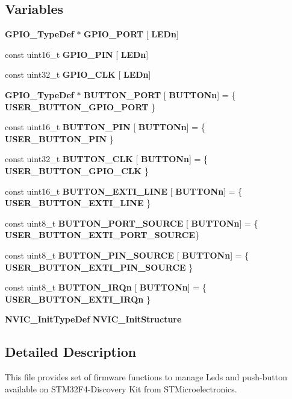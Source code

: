 \subsection*{Variables}
\begin{DoxyCompactItemize}
\item 
\textbf{ G\+P\+I\+O\+\_\+\+Type\+Def} $\ast$ \textbf{ G\+P\+I\+O\+\_\+\+P\+O\+RT} [\textbf{ L\+E\+Dn}]
\item 
const uint16\+\_\+t \textbf{ G\+P\+I\+O\+\_\+\+P\+IN} [\textbf{ L\+E\+Dn}]
\item 
const uint32\+\_\+t \textbf{ G\+P\+I\+O\+\_\+\+C\+LK} [\textbf{ L\+E\+Dn}]
\item 
\textbf{ G\+P\+I\+O\+\_\+\+Type\+Def} $\ast$ \textbf{ B\+U\+T\+T\+O\+N\+\_\+\+P\+O\+RT} [\textbf{ B\+U\+T\+T\+O\+Nn}] = \{\textbf{ U\+S\+E\+R\+\_\+\+B\+U\+T\+T\+O\+N\+\_\+\+G\+P\+I\+O\+\_\+\+P\+O\+RT} \}
\item 
const uint16\+\_\+t \textbf{ B\+U\+T\+T\+O\+N\+\_\+\+P\+IN} [\textbf{ B\+U\+T\+T\+O\+Nn}] = \{\textbf{ U\+S\+E\+R\+\_\+\+B\+U\+T\+T\+O\+N\+\_\+\+P\+IN} \}
\item 
const uint32\+\_\+t \textbf{ B\+U\+T\+T\+O\+N\+\_\+\+C\+LK} [\textbf{ B\+U\+T\+T\+O\+Nn}] = \{\textbf{ U\+S\+E\+R\+\_\+\+B\+U\+T\+T\+O\+N\+\_\+\+G\+P\+I\+O\+\_\+\+C\+LK} \}
\item 
const uint16\+\_\+t \textbf{ B\+U\+T\+T\+O\+N\+\_\+\+E\+X\+T\+I\+\_\+\+L\+I\+NE} [\textbf{ B\+U\+T\+T\+O\+Nn}] = \{\textbf{ U\+S\+E\+R\+\_\+\+B\+U\+T\+T\+O\+N\+\_\+\+E\+X\+T\+I\+\_\+\+L\+I\+NE} \}
\item 
const uint8\+\_\+t \textbf{ B\+U\+T\+T\+O\+N\+\_\+\+P\+O\+R\+T\+\_\+\+S\+O\+U\+R\+CE} [\textbf{ B\+U\+T\+T\+O\+Nn}] = \{\textbf{ U\+S\+E\+R\+\_\+\+B\+U\+T\+T\+O\+N\+\_\+\+E\+X\+T\+I\+\_\+\+P\+O\+R\+T\+\_\+\+S\+O\+U\+R\+CE}\}
\item 
const uint8\+\_\+t \textbf{ B\+U\+T\+T\+O\+N\+\_\+\+P\+I\+N\+\_\+\+S\+O\+U\+R\+CE} [\textbf{ B\+U\+T\+T\+O\+Nn}] = \{\textbf{ U\+S\+E\+R\+\_\+\+B\+U\+T\+T\+O\+N\+\_\+\+E\+X\+T\+I\+\_\+\+P\+I\+N\+\_\+\+S\+O\+U\+R\+CE} \}
\item 
const uint8\+\_\+t \textbf{ B\+U\+T\+T\+O\+N\+\_\+\+I\+R\+Qn} [\textbf{ B\+U\+T\+T\+O\+Nn}] = \{\textbf{ U\+S\+E\+R\+\_\+\+B\+U\+T\+T\+O\+N\+\_\+\+E\+X\+T\+I\+\_\+\+I\+R\+Qn} \}
\item 
\textbf{ N\+V\+I\+C\+\_\+\+Init\+Type\+Def} \textbf{ N\+V\+I\+C\+\_\+\+Init\+Structure}
\end{DoxyCompactItemize}


\subsection{Detailed Description}
This file provides set of firmware functions to manage Leds and push-\/button available on S\+T\+M32\+F4-\/\+Discovery Kit from S\+T\+Microelectronics. 

